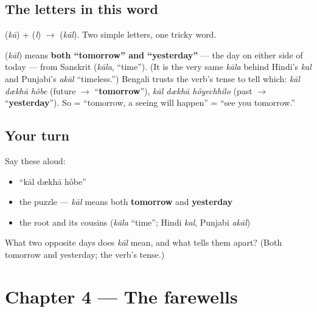 \subsection*{The letters in this word}
\textbf{} (\emph{kā}) + \textbf{} (\emph{l}) $\to$ \textbf{} (\emph{kāl}). Two simple letters, one tricky word.

\begin{cousinweb}
\textbf{} (\emph{kāl}) means \textbf{both \textquotedblleft{}tomorrow\textquotedblright{} and \textquotedblleft{}yesterday\textquotedblright{}} — the day on either side of today — from Sanskrit \textbf{} (\emph{kāla}, \textquotedblleft{}time\textquotedblright{}). (It is the very same \emph{kāla} behind Hindi's \emph{kal} and Punjabi's \emph{akāl} \textquotedblleft{}timeless.\textquotedblright{}) Bengali trusts the verb's tense to tell which: \emph{kāl dækhā hôbe} (future $\to$ \textquotedblleft{}\textbf{tomorrow}\textquotedblright{}), \emph{kāl dækhā hôyechhilo} (past $\to$ \textquotedblleft{}\textbf{yesterday}\textquotedblright{}). So \textbf{  } = \textquotedblleft{}tomorrow, a seeing will happen\textquotedblright{} = \textquotedblleft{}see you tomorrow.\textquotedblright{}
\end{cousinweb}

\subsection*{Your turn}
Say these aloud:

\begin{itemize}
\raggedright
  \item \textquotedblleft{}kāl dækhā hôbe\textquotedblright{}
  \item the puzzle — \emph{kāl} means both \textbf{tomorrow} and \textbf{yesterday}
  \item the root and its cousins (\emph{kāla} \textquotedblleft{}time\textquotedblright{}; Hindi \emph{kal}, Punjabi \emph{akāl})
\end{itemize}

\begin{tcolorbox}[breakable,colback=teal!4,colframe=teal!35!black,title={Before you move on}]
What two opposite days does \emph{kāl} mean, and what tells them apart? (Both tomorrow and yesterday; the verb's tense.)
\end{tcolorbox}
\section[Practice]{Chapter 4 — The farewells}


